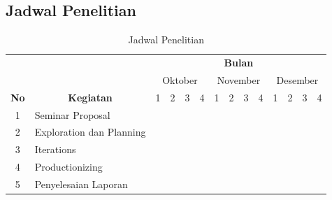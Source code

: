 \begin{spacing}{2}
\section{Jadwal Penelitian}
	\begin{table}[H]
  \centering
  \caption{Jadwal Penelitian}
  \label{my-label}
  \begin{tabular}{|c|l|l|l|l|l|l|l|l|l|l|l|l|l|}
  \hline
                                & \multicolumn{1}{c|}{}                                    & \multicolumn{12}{c|}{\textbf{Bulan}}                                                                                                                                                             \\ \cline{3-14} 
                                & \multicolumn{1}{c|}{}                                    & \multicolumn{4}{c|}{Oktober}                                                         & \multicolumn{4}{c|}{November}                             & \multicolumn{4}{c|}{Desember}                 \\ \cline{3-14} 
  \multirow{-3}{*}{\textbf{No}} & \multicolumn{1}{c|}{\multirow{-3}{*}{\textbf{Kegiatan}}} & 1                     & 2                             & 3             & 4            & 1        & 2        & 3        & 4                        & 1         & 2         & 3         & 4         \\ \hline
  1                             & Seminar Proposal                                         & \multicolumn{2}{l|}{\cellcolor[HTML]{656565}}         &               &              &          &          &          &                          &           &           &           &           \\ \hline
  2                             & Exploration dan Planning                                 &                       & \multicolumn{2}{l|}{\cellcolor[HTML]{656565}} &              &          &          &          &                          &           &           &           &           \\ \hline
  3                             & Iterations                                               &                       &                               &               & \multicolumn{4}{l|}{\cellcolor[HTML]{656565}} &                          &           &           &           &           \\ \hline
  4                             & Productionizing                                          &                       &                               &               &              &          &          &          & \cellcolor[HTML]{656565} &           &           &           &           \\ \hline
  5                             & Penyelesaian Laporan                                     &                       &                               &               &              &          &          &          &                          & \multicolumn{4}{l|}{\cellcolor[HTML]{656565}} \\ \hline
  \end{tabular}
  \end{table}

\end{spacing}

